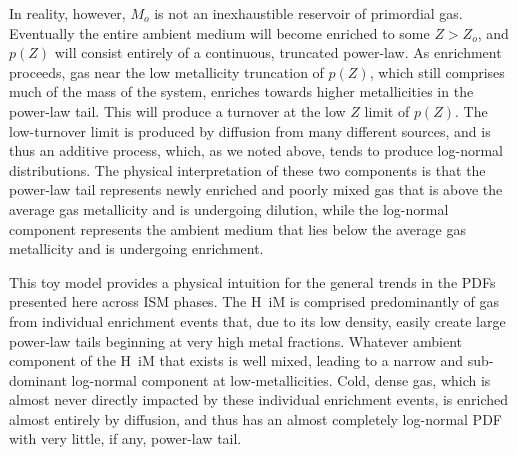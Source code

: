 \documentclass[twocolumn]{aastex61}
\begin{document}
In reality, however, $M_o$ is not an inexhaustible reservoir of primordial gas. Eventually the entire ambient medium will become enriched to some $Z > Z_o$, and $p(Z)$ will consist entirely of a continuous, truncated power-law. As enrichment proceeds, gas near the low metallicity truncation of $p(Z)$, which still comprises much of the mass of the system, enriches towards higher metallicities in the power-law tail. This will produce a turnover at the low $Z$ limit of $p(Z)$. The low-turnover limit is produced by diffusion from many different sources, and is thus an additive process, which, as we noted above, tends to produce log-normal distributions. The physical interpretation of these two components is that the power-law tail represents newly enriched and poorly mixed gas that is above the average gas metallicity and is undergoing dilution, while the log-normal component represents the ambient medium that lies below the average gas metallicity and is undergoing enrichment.

This toy model provides a physical intuition for the general trends in the PDFs presented here across ISM phases. The H~{\sc i}M is comprised predominantly of gas from individual enrichment events that, due to its low density, easily create large power-law tails beginning at very high metal fractions. Whatever ambient component of the H~{\sc i}M that exists is well mixed, leading to a narrow and sub-dominant log-normal component at low-metallicities. Cold, dense gas, which is almost never directly impacted by these individual enrichment events, is enriched almost entirely by diffusion, and thus has an almost completely log-normal PDF with very little, if any, power-law tail.

%
%
%
\end{document}
